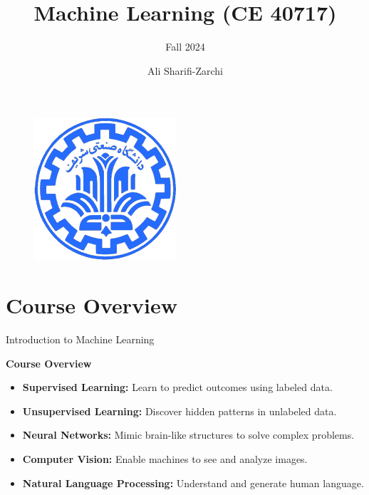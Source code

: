 \documentclass[serif, aspectratio=169]{beamer}
\author{Ali Sharifi-Zarchi}
\title{Machine Learning (CE 40717)}
\subtitle{Fall 2024}
\institute{
    CE Department \\
    Sharif University of Technology
}
\begin{document}
\begin{frame}
    \titlepage
    \vspace*{-0.6cm}
    \begin{figure}[htpb]
        \begin{center}
            \includegraphics[keepaspectratio, scale=0.25]{pic/sharif-main-logo.png}
        \end{center}
    \end{figure}
\end{frame}

\begin{frame}    
\tableofcontents[sectionstyle=show,
subsectionstyle=show/shaded/hide,
subsubsectionstyle=show/shaded/hide]
\end{frame}


\section{Course Overview}
\begin{frame}{Introduction to Machine Learning}

\textbf{Course Overview}

\begin{itemize}
    \item \textbf{Supervised Learning:} Learn to predict outcomes using labeled data.
    \item \textbf{Unsupervised Learning:} Discover hidden patterns in unlabeled data.
    \item \textbf{Neural Networks:} Mimic brain-like structures to solve complex problems.
    \item \textbf{Computer Vision:} Enable machines to see and analyze images.
    \item \textbf{Natural Language Processing:} Understand and generate human language.
\end{itemize}

\end{frame}
\end{document}
